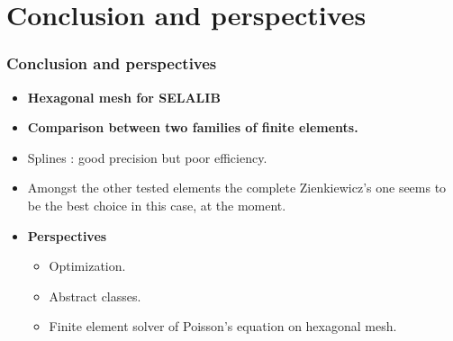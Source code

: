\documentclass[]{beamer}
\begin{document}
\section{Conclusion and perspectives}
\begin{frame}
	\frametitle{Conclusion and perspectives}

	\begin{itemize}
	 \item \textbf{Hexagonal mesh for SELALIB}	
	 \item \textbf{Comparison between two families of finite elements.} \\
	 \item[] 	Splines : good precision but poor efficiency.   	
	\item[] 	Amongst the other tested elements the complete Zienkiewicz's one seems to be the best choice in this case, at the moment.  
	
\item \textbf{Perspectives}
	 \begin{itemize}
	 \item[] Optimization.
	 \item[] Abstract classes.
	 \item[] Finite element solver of Poisson's equation on hexagonal mesh.
	\end{itemize}
	
	\end{itemize}
\end{frame}
\end{document}
